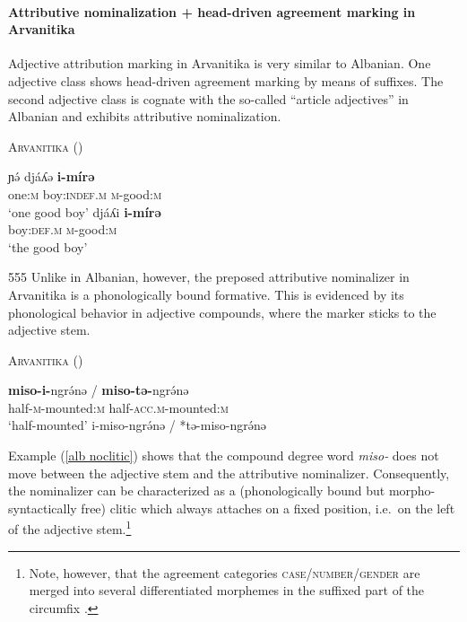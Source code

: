 \paragraph{Attributive nominalization + head-driven agreement marking in Arvanitika}
Adjective attribution marking in Arvanitika is very similar to Albanian. One adjective class shows head-driven agreement marking by means of suffixes. The second adjective class is cognate with the so-called “article adjectives” in Albanian and exhibits attributive nominalization. 
\begin{exe}
\ex \textsc{Arvanitika} (\citealt[303]{sasse1991})
\begin{xlist}
\ex
\gll	ɲə́ 			djáʎə 			\textbf{i-mírə}\\
	one:\textsc{m} 	boy:\textsc{indef.m} 	\textsc{m}-good:\textsc{m}\\
\glt	‘one good boy’
\ex
\gll				djáʎi 				\textbf{i-mírə}\\
				boy:\textsc{def.m} 	\textsc{m}-good:\textsc{m}\\
\glt	‘the good boy’
\end{xlist}
\end{exe}
555
Unlike in Albanian, however, the preposed attributive nominalizer in Arvanitika is a phonologically bound formative. This is evidenced by its phonological behavior in adjective compounds, where the marker sticks to the adjective stem.
\begin{exe}
\ex \textsc{Arvanitika} (\citealt[304]{sasse1991}) \label{alb noclitic}
\begin{xlist}
\ex
\gll	\textbf{miso-i-}ngrə́nə / \textbf{miso-tə-}ngrə́nə\\
	half-\textsc{m}-mounted:\textsc{m} { } half-\textsc{acc.m}-mounted:\textsc{m}\\
\glt	‘half-mounted’
\ex	*i-miso-ngrə́nə / *tə-miso-ngrə́nə
\end{xlist}
\end{exe}
Example (\ref{alb noclitic}) shows that the compound degree word {\it miso-} does not move between the adjective stem and the attributive nominalizer. Consequently, the nominalizer can be characterized as a (phonologically bound but morpho-syntactically free) clitic which always attaches on a fixed position, i.e.~on the left of the adjective stem.\footnote{Note, however, that the agreement categories \textsc{case/number/gender} are merged into several differentiated morphemes in the suffixed part of the circumfix \cite[124–128]{sasse1991}.}

